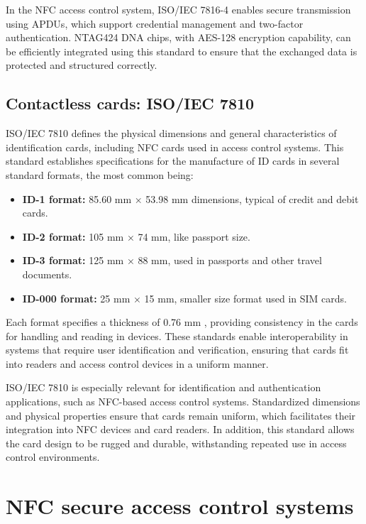 In the NFC access control system, ISO/IEC 7816-4 enables secure transmission using APDUs, which support credential management and two-factor authentication. NTAG424 DNA chips, with AES-128 encryption capability, can be efficiently integrated using this standard to ensure that the exchanged data is protected and structured correctly.

\subsection{Contactless cards: ISO/IEC 7810}

ISO/IEC 7810 \cite{Ref25} defines the physical dimensions and general characteristics of identification cards, including NFC cards used in access control systems. This standard establishes specifications for the manufacture of ID cards in several standard formats, the most common being:

\begin{itemize}
	\item \textbf{ID-1 format:} 85.60 mm × 53.98 mm dimensions, typical of credit and debit cards.
	\item \textbf{ID-2 format:} 105 mm × 74 mm, like passport size.
	\item \textbf{ID-3 format:} 125 mm × 88 mm, used in passports and other travel documents.
	\item \textbf{ID-000 format:} 25 mm × 15 mm, smaller size format used in SIM cards.
\end{itemize}

Each format specifies a thickness of 0.76 mm \cite{Ref25}, providing consistency in the cards for handling and reading in devices. These standards enable interoperability in systems that require user identification and verification, ensuring that cards fit into readers and access control devices in a uniform manner.

ISO/IEC 7810 is especially relevant for identification and authentication applications, such as NFC-based access control systems. Standardized dimensions and physical properties ensure that cards remain uniform, which facilitates their integration into NFC devices and card readers. In addition, this standard allows the card design to be rugged and durable, withstanding repeated use in access control environments.



\section{NFC secure access control systems}

